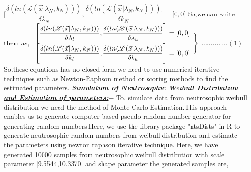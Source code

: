 \documentclass[12pt,a4paper,oneside]{article}
\begin{document}
\hspace*{4cm}$\Biggl[\dfrac{\delta(ln(\mathscr{L}(\vec{x}|\lambda_{N},k_{N})))}{\delta\lambda_{N}},\dfrac{\delta(ln(\mathscr{L}(\vec{x}|\lambda_{N},k_{N})))}{\delta k_{N}}\Biggr]=\Biggl[0,0\Biggr]$\newline\newline\newline\newline
So,we can write them as,\newline\newline\newline
\begin{math}
\begin{array}{l}
\Biggl[\dfrac{\delta(ln(\mathscr{L}(\vec{x}|\lambda_{N},k_{N})))}{\delta\lambda_{l}},\dfrac{\delta(ln(\mathscr{L}(\vec{x}|\lambda_{N},k_{N})))}{\delta\lambda_{u}}\Biggr]=[0,0]\\
\newline\newline\newline
\Biggl[\dfrac{\delta(ln(\mathscr{L}(\vec{x}|\lambda_{N},k_{N})))}{\delta k_{l}},\dfrac{\delta(ln(\mathscr{L}(\vec{x}|\lambda_{N},k_{N})))}{\delta k_{u}}\Biggr]=[0,0]
\end{array}
\Biggr\}
\end{math}
$..............(1)$
\newline\newline\newline
So,these equations has no closed form we need to use numerical iterative techniques such as Newton-Raphson method or scoring methods to find the estimated parameters.\newpage
\textrm{\textit{\textbf{\underline{Simulation of Neutrosophic Weibull Distribution and Estimation of parameters:$-$}}}}\newline\newline
To, simulate data from neutrosophic weibull distribution we need the method of Monte Carlo Estimation.This approach enables  us to generate computer based pseudo random number generator for generating random numbers.Here, we use the library package "ntsDists" in R to generate  neutrosophic random numbers from weibull distribution and estimate the parameters using newton raphson iterative technique.\newline\newline
Here, we have generated 10000 samples from neutrosophic weibull distribution with scale parameter [9.5544,10.3370] and shape parameter  the generated samples are,\newline\newline
\end{document}
